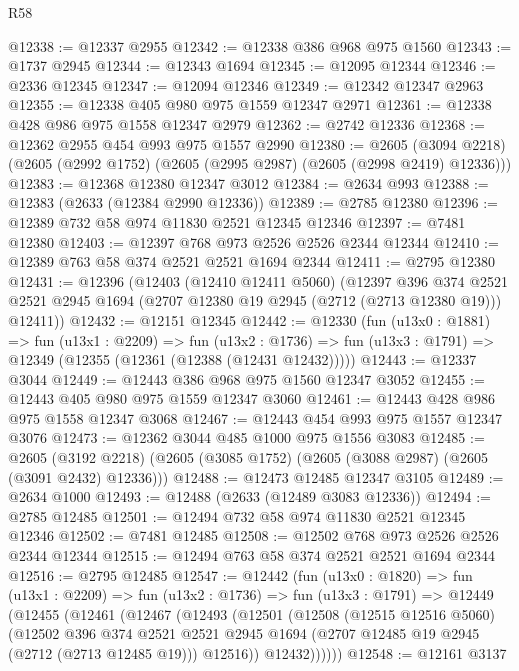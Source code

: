 \begin{lexlean}{R58}
\begin{coremodule}
@12338 := @12337 @2955
@12342 := @12338 @386 @968 @975 @1560
@12343 := @1737 @2945
@12344 := @12343 @1694
@12345 := @12095 @12344
@12346 := @2336 @12345
@12347 := @12094 @12346
@12349 := @12342 @12347 @2963
@12355 := @12338 @405 @980 @975 @1559 @12347 @2971
@12361 := @12338 @428 @986 @975 @1558 @12347 @2979
@12362 := @2742 @12336
@12368 := @12362 @2955 @454 @993 @975 @1557 @2990
@12380 := @2605
    (@3094 @2218)
    (@2605 (@2992 @1752) (@2605 (@2995 @2987) (@2605 (@2998 @2419) @12336)))
@12383 := @12368 @12380 @12347 @3012
@12384 := @2634 @993
@12388 := @12383 (@2633 (@12384 @2990 @12336))
@12389 := @2785 @12380
@12396 := @12389 @732 @58 @974 @11830 @2521 @12345 @12346
@12397 := @7481 @12380
@12403 := @12397 @768 @973 @2526 @2526 @2344 @12344
@12410 := @12389 @763 @58 @374 @2521 @2521 @1694 @2344
@12411 := @2795 @12380
@12431 := @12396
    (@12403
      (@12410 @12411 @5060)
      (@12397
        @396
        @374
        @2521
        @2521
        @2945
        @1694
        (@2707 @12380 @19 @2945 (@2712 (@2713 @12380 @19)))
        @12411))
@12432 := @12151 @12345
@12442 := @12330
    (fun (u13x0 : @1881) =>
    fun (u13x1 : @2209) =>
    fun (u13x2 : @1736) => fun (u13x3 : @1791) => @12349 (@12355 (@12361 (@12388 (@12431 @12432)))))
@12443 := @12337 @3044
@12449 := @12443 @386 @968 @975 @1560 @12347 @3052
@12455 := @12443 @405 @980 @975 @1559 @12347 @3060
@12461 := @12443 @428 @986 @975 @1558 @12347 @3068
@12467 := @12443 @454 @993 @975 @1557 @12347 @3076
@12473 := @12362 @3044 @485 @1000 @975 @1556 @3083
@12485 := @2605
    (@3192 @2218)
    (@2605 (@3085 @1752) (@2605 (@3088 @2987) (@2605 (@3091 @2432) @12336)))
@12488 := @12473 @12485 @12347 @3105
@12489 := @2634 @1000
@12493 := @12488 (@2633 (@12489 @3083 @12336))
@12494 := @2785 @12485
@12501 := @12494 @732 @58 @974 @11830 @2521 @12345 @12346
@12502 := @7481 @12485
@12508 := @12502 @768 @973 @2526 @2526 @2344 @12344
@12515 := @12494 @763 @58 @374 @2521 @2521 @1694 @2344
@12516 := @2795 @12485
@12547 := @12442
    (fun (u13x0 : @1820) =>
    fun (u13x1 : @2209) =>
    fun (u13x2 : @1736) =>
    fun (u13x3 : @1791) =>
    @12449
      (@12455
        (@12461
          (@12467
            (@12493
              (@12501
                (@12508
                  (@12515 @12516 @5060)
                  (@12502
                    @396
                    @374
                    @2521
                    @2521
                    @2945
                    @1694
                    (@2707 @12485 @19 @2945 (@2712 (@2713 @12485 @19)))
                    @12516))
                @12432))))))
@12548 := @12161 @3137

\end{coremodule}
\end{lexlean}

